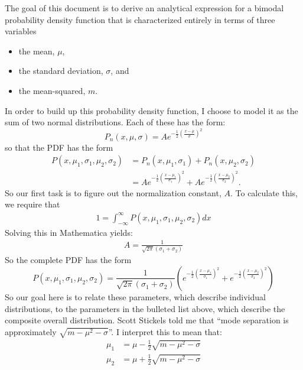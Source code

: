 \documentclass{article}
\begin{document}
The goal of this document is to derive an analytical expression for a bimodal probability density function that is characterized entirely in terms of three variables
\begin{itemize}
\item the mean, $\mu$,
\item the standard deviation, $\sigma$, and
\item the mean-squared, $m$.
\end{itemize}	

In order to build up this probability density function, I choose to model it as the sum of two normal distributions.  Each of these has the form:
\begin{equation}
P_n(x,\mu,\sigma) = A e^{-\frac{1}{2}\left(\frac{x-\mu}{\sigma}\right)^2}
\end{equation}
so that the PDF has the form
\begin{align}
P(x,\mu_1,\sigma_1,\mu_2,\sigma_2) & = P_n(x,\mu_1,\sigma_1) + P_n(x,\mu_2,\sigma_2)\\
& =  A e^{-\frac{1}{2}\left(\frac{x-\mu_1}{\sigma_1}\right)^2}+ A e^{-\frac{1}{2}\left(\frac{x-\mu_2}{\sigma_2}\right)^2}.
\end{align}
So our first task is to figure out the normalization constant, $A$.  To calculate this, we require that
\begin{align}
1 = \int_{-\infty}^{\infty} P(x,\mu_1,\sigma_1,\mu_2,\sigma_2)dx
\end{align}
Solving this in Mathematica yields:
\begin{align}
A=\frac{1}{\sqrt{2 \pi}\left(\sigma_1 + \sigma_2 \right)}
\end{align}
So the complete PDF has the form
\begin{equation}
P(x,\mu_1,\sigma_1,\mu_2,\sigma_2) = \frac{1}{\sqrt{2 \pi}\left(\sigma_1 + \sigma_2 \right)}\left( e^{-\frac{1}{2}\left(\frac{x-\mu_1}{\sigma_1}\right)^2}+  e^{-\frac{1}{2}\left(\frac{x-\mu_2}{\sigma_2}\right)^2}\right)
\end{equation}
So our goal here is to relate these parameters, which describe individual distributions, to the parameters in the bulleted list above, which describe the composite overall distribution.  Scott Stickels told me that ``mode separation is approximately $\sqrt{m-\mu^2-\sigma}$''.  I interpret this to mean that:
\begin{align}
\mu_1 & = \mu - \frac{1}{2}\sqrt{m-\mu^2-\sigma} \\
\mu_2 & = \mu + \frac{1}{2}\sqrt{m-\mu^2-\sigma} 
\end{align}
\end{document}
